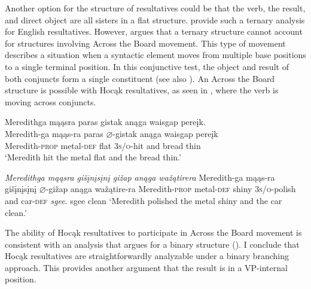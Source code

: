 \documentclass[output=paper]{LSP/langsci}
\begin{document}
Another option for the structure of resultatives could be that the verb, the result, and direct object are all sisters in a flat structure.  \citet{CarrierRandall1992} provide such a ternary analysis for English resultatives. However, \citet{Bowers1997} argues that a ternary structure cannot account for structures involving Across the Board movement. This type of movement describes a situation when a syntactic element moves from multiple base positions to a single terminal position. In this conjunctive test, the object and result of both conjuncts form a single constituent (see also \citealt{Li1999}). An Across the Board structure is possible with Hocąk resultatives, as seen in , where the verb is moving across conjuncts.

\begin{exe}
\ex
\begin{xlist}

\ex \glll Meredithga mąąsra paras gistak anąga waisgap pereįk. \\
Meredith-ga mąąs-ra paras {$\varnothing$}-gistak anąga waisgap pereįk\\
Meredith-\textsc{prop} metal-\textsc{def} flat \textsc{3s/o}-hit and bread thin\\
\glt `Meredith hit the metal flat and the bread thin.'

\ex \textit{Meredithga \hspace{1.58em} mąąsra \hspace{.9em} gišįnį{s}įnį \hspace{.1em}gižap  \hspace {2.4em} anąga wažątirera}  \newline Meredith-ga \hspace{1.18em} mąąs-ra \hspace {.5em} gišįnį{s}įnį {$\varnothing$}-gižap \hspace{1.3em} anąga wažątire-ra \newline Meredith-\textsc{prop} metal-\textsc{def} shiny \hspace{1.6em} \textsc{3s/o}-polish and \hspace{1em} car-\textsc{def} \newline\textit{sgee}. \newline
sgee \newline
clean \newline
`Meredith polished the metal shiny and the car clean.'

\end{xlist}
\end{exe}
 
The ability of Hocąk resultatives to participate in Across the Board movement is consistent with an analysis that argues for a binary structure (\citealt{Bowers1997}). I conclude that Hocąk resultatives are straightforwardly analyzable under a binary branching approach. This provides another argument that the result is in a VP-internal position.
 
\end{document}
